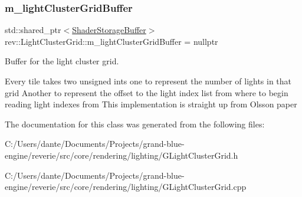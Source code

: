 \subsubsection{\texorpdfstring{m\_lightClusterGridBuffer}{m\_lightClusterGridBuffer}}
{\footnotesize\ttfamily std\+::shared\+\_\+ptr$<$\mbox{\hyperlink{classrev_1_1_shader_storage_buffer}{Shader\+Storage\+Buffer}}$>$ rev\+::\+Light\+Cluster\+Grid\+::m\+\_\+light\+Cluster\+Grid\+Buffer = nullptr\hspace{0.3cm}{\ttfamily [protected]}}



Buffer for the light cluster grid. 

Every tile takes two unsigned ints one to represent the number of lights in that grid Another to represent the offset to the light index list from where to begin reading light indexes from This implementation is straight up from Olsson paper 

The documentation for this class was generated from the following files\+:\begin{DoxyCompactItemize}
\item 
C\+:/\+Users/dante/\+Documents/\+Projects/grand-\/blue-\/engine/reverie/src/core/rendering/lighting/G\+Light\+Cluster\+Grid.\+h\item 
C\+:/\+Users/dante/\+Documents/\+Projects/grand-\/blue-\/engine/reverie/src/core/rendering/lighting/G\+Light\+Cluster\+Grid.\+cpp\end{DoxyCompactItemize}
